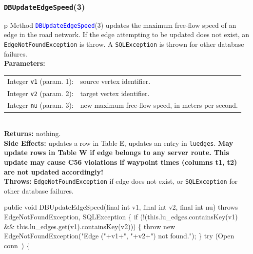 \documentclass{article}
\theoremstyle{definition}                   %
\begin{document}
\subsubsection{{\tt{}\protect{}DBUpdateEdgeSpeed}(3)}
\begin{tabular}{p{\textwidth}}
\toprule
{}
Method \textcolor{blue}{{\tt{}\protect{}DBUpdateEdgeSpeed}}(3) updates the maximum free-flow
speed of an edge in the road network. If the edge attempting to be updated
does not exist, an {\tt{}EdgeNotFoundException} is throw.
A {\tt{}SQLException} is thrown for other database failures.\\
\midrule
\textbf{Parameters:} \\
\begin{tabular}{lp{116mm}}
Integer {\tt{}v1} (param. 1):&source vertex identifier.\\
Integer {\tt{}v2} (param. 2):&target vertex identifier.\\
Integer {\tt{}nu} (param. 3):&new maximum free-flow speed, in meters per second.
\end{tabular}\\
\textbf{Returns:} nothing.\\
\textbf{Side Effects:} updates a row in Table E, updates an entry in
{\tt{}\protect{}lu{}edges}. \textbf{May update rows in Table W if edge belongs to
any server route. This update may cause C56 violations if waypoint times
(columns \textsf{t1}, \textsf{t2}) are not updated accordingly!}\\
\textbf{Throws:} {\tt{}EdgeNotFoundException} if edge does not exist,
or {\tt{}SQLException} for other database failures.\\
\bottomrule
\end{tabular}
\nwenddocs{}\endmoddef{}
public void DBUpdateEdgeSpeed(final int v1, final int v2, final int nu)
throws EdgeNotFoundException, SQLException \{
  if (!(this.lu_edges.containsKey(v1) && this.lu_edges.get(v1).containsKey(v2))) \{
    throw new EdgeNotFoundException("Edge ("+v1+", "+v2+") not found.");
  \}
  try (\LA{}Open \code{}conn\edoc{}~{\nwtagstyle{}}\RA{}) \{
\end{document}
